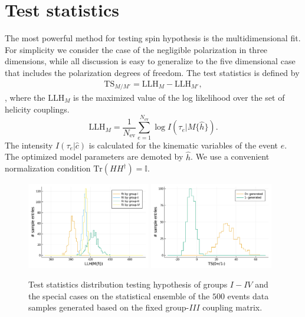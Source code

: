 \documentclass[prd,preprintnumbers,floatfix,
nofootinbib,superscriptaddress]{revtex4}
\newcommand{\diff}{\mathrm{d}}
\newcommand{\TS}{\mathrm{TS}}
\newcommand{\LLH}{\mathrm{LLH}}
\newcommand{\I}{\ensuremath{I}}
\newcommand{\III}{\ensuremath{{I\!I\!I}}}
\newcommand{\IV}{\ensuremath{{I\!V}}}
\begin{document}
\section{Test statistics}
The most powerful method for testing spin hypothesis is the multidimensional fit.
For simplicity we consider the case of the negligible polarization in three dimensions, while all discussion is easy to generalize to the five dimensional case that includes
the polarization degrees of freedom.
The test statistics is defined by
\begin{align}
  \TS_{M/M'} = \LLH_M - \LLH_{M'},
\end{align},
where the $\LLH_M$ is the maximized value of the log likelihood over the set of helicity couplings.
\begin{equation}
  \LLH_M = \frac{1}{N_\mathrm{ev}} \sum_{e=1}^{N_\mathrm{ev}} \log I(\tau_e|M\{\hat{h}\}).
\end{equation}
The intensity $I(\tau_e|\hat{c})$ is calculated for the kinematic variables of the event $e$.
The optimized model parameters are demoted by $\hat{h}$. We use a convenient normalization condition $\mathrm{Tr}(HH^\dagger) = \mathbb{I}$.
\begin{figure}
  \includegraphics[width=0.48\textwidth]{../plots/llh_testing_higgs.pdf}
  \includegraphics[width=0.48\textwidth]{../plots/TS_0p_vs_1m.pdf}
  \caption{Test statistics distribution testing hypothesis of groups $\I-\IV$ and the special cases on the statistical ensemble of the $500$ events data samples generated based on
  the fixed group-$\III$ coupling matrix. }
  \label{fig:TS.fixedH}
\end{figure}
\end{document}
